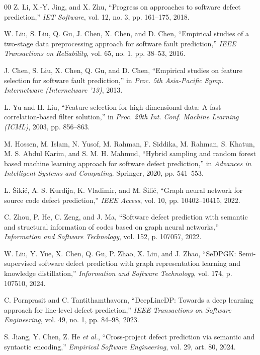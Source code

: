 \documentclass[conference,a4paper]{IEEEtran}
\begin{document}
\begin{thebibliography}{00}
 Z. Li, X.-Y. Jing, and X. Zhu, ``Progress on approaches to software defect prediction,'' \textit{IET Software}, vol. 12, no. 3, pp. 161--175, 2018.

 W. Liu, S. Liu, Q. Gu, J. Chen, X. Chen, and D. Chen, ``Empirical studies of a two-stage data preprocessing approach for software fault prediction,'' \textit{IEEE Transactions on Reliability}, vol. 65, no. 1, pp. 38--53, 2016.

 J. Chen, S. Liu, X. Chen, Q. Gu, and D. Chen, ``Empirical studies on feature selection for software fault prediction,'' in \textit{Proc. 5th Asia-Pacific Symp. Internetware (Internetware '13)}, 2013.

 L. Yu and H. Liu, ``Feature selection for high-dimensional data: A fast correlation-based filter solution,'' in \textit{Proc. 20th Int. Conf. Machine Learning (ICML)}, 2003, pp. 856--863.

 M. Hossen, M. Islam, N. Yusof, M. Rahman, F. Siddika, M. Rahman, S. Khatun, M. S. Abdul Karim, and S. M. H. Mahmud, ``Hybrid sampling and random forest based machine learning approach for software defect prediction,'' in \textit{Advances in Intelligent Systems and Computing}. Springer, 2020, pp. 541--553.

 L. {\v S}iki\'c, A. S. Kurdija, K. Vladimir, and M. {\v S}ili\'c, ``Graph neural network for source code defect prediction,'' \textit{IEEE Access}, vol. 10, pp. 10402--10415, 2022.

 C. Zhou, P. He, C. Zeng, and J. Ma, ``Software defect prediction with semantic and structural information of codes based on graph neural networks,'' \textit{Information and Software Technology}, vol. 152, p. 107057, 2022.

 W. Liu, Y. Yue, X. Chen, Q. Gu, P. Zhao, X. Liu, and J. Zhao, ``SeDPGK: Semi-supervised software defect prediction with graph representation learning and knowledge distillation,'' \textit{Information and Software Technology}, vol. 174, p. 107510, 2024.

 C. Pornprasit and C. Tantithamthavorn, ``DeepLineDP: Towards a deep learning approach for line-level defect prediction,'' \textit{IEEE Transactions on Software Engineering}, vol. 49, no. 1, pp. 84--98, 2023.

 S. Jiang, Y. Chen, Z. He \textit{et al.}, ``Cross-project defect prediction via semantic and syntactic encoding,'' \textit{Empirical Software Engineering}, vol. 29, art. 80, 2024.   %


\end{thebibliography}
\end{document}

